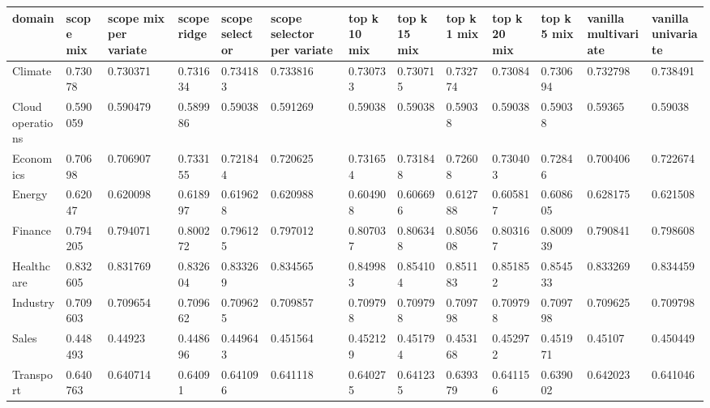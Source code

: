\begin{tabular}{lllllllllllll}
\toprule
domain & scope mix & scope mix per variate & scope ridge & scope selector & scope selector per variate & top k 10 mix & top k 15 mix & top k 1 mix & top k 20 mix & top k 5 mix & vanilla multivariate & vanilla univariate \\
\midrule
Climate & 0.73078 & 0.730371 & 0.731634 & 0.734183 & 0.733816 & 0.730733 & 0.730715 & 0.732774 & 0.73084 & 0.730694 & 0.732798 & 0.738491 \\
Cloud operations & 0.590059 & 0.590479 & 0.589986 & 0.59038 & 0.591269 & 0.59038 & 0.59038 & 0.59038 & 0.59038 & 0.59038 & 0.59365 & 0.59038 \\
Economics & 0.70698 & 0.706907 & 0.733155 & 0.721844 & 0.720625 & 0.731654 & 0.731848 & 0.72608 & 0.730403 & 0.72846 & 0.700406 & 0.722674 \\
Energy & 0.62047 & 0.620098 & 0.618997 & 0.619628 & 0.620988 & 0.604908 & 0.606696 & 0.612788 & 0.605817 & 0.608605 & 0.628175 & 0.621508 \\
Finance & 0.794205 & 0.794071 & 0.800272 & 0.796125 & 0.797012 & 0.807037 & 0.806348 & 0.805608 & 0.803167 & 0.800939 & 0.790841 & 0.798608 \\
Healthcare & 0.832605 & 0.831769 & 0.832604 & 0.833269 & 0.834565 & 0.849983 & 0.854104 & 0.851183 & 0.851852 & 0.854533 & 0.833269 & 0.834459 \\
Industry & 0.709603 & 0.709654 & 0.709662 & 0.709625 & 0.709857 & 0.709798 & 0.709798 & 0.709798 & 0.709798 & 0.709798 & 0.709625 & 0.709798 \\
Sales & 0.448493 & 0.44923 & 0.448696 & 0.449643 & 0.451564 & 0.452129 & 0.451794 & 0.453168 & 0.452972 & 0.451971 & 0.45107 & 0.450449 \\
Transport & 0.640763 & 0.640714 & 0.64091 & 0.641096 & 0.641118 & 0.640275 & 0.641235 & 0.639379 & 0.641156 & 0.639002 & 0.642023 & 0.641046 \\
\bottomrule
\end{tabular}
